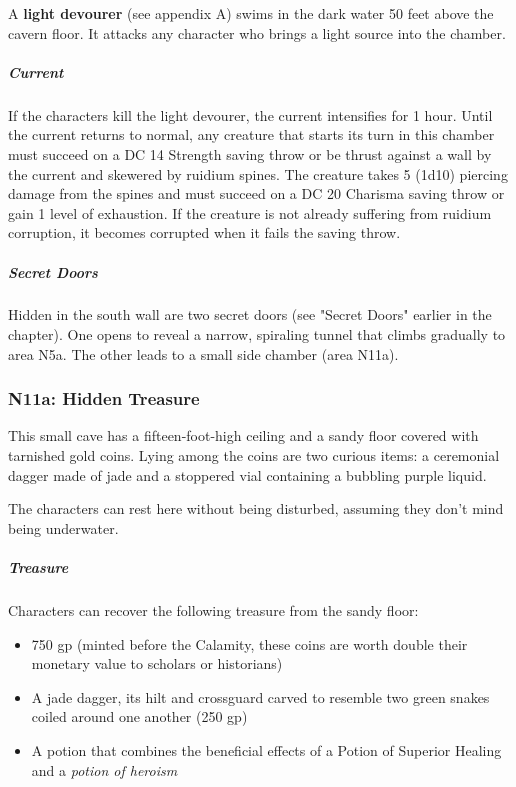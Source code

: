 \documentclass[10pt,a4paper,twoside,bg=print,twocolumn,openany,nodeprecatedcode]{dndbook}
\begin{document}
A \textbf{light devourer} (see appendix A) swims in the dark water 50 feet above the cavern floor. It attacks any character who brings a light source into the chamber.

\subparagraph{Current}
If the characters kill the light devourer, the current intensifies for 1 hour. Until the current returns to normal, any creature that starts its turn in this chamber must succeed on a DC 14 Strength saving throw or be thrust against a wall by the current and skewered by ruidium spines. The creature takes 5 (1d10) piercing damage from the spines and must succeed on a DC 20 Charisma saving throw or gain 1 level of exhaustion. If the creature is not already suffering from ruidium corruption, it becomes corrupted when it fails the saving throw.

\subparagraph{Secret Doors}
Hidden in the south wall are two secret doors (see "Secret Doors" earlier in the chapter). One opens to reveal a narrow, spiraling tunnel that climbs gradually to area N5a. The other leads to a small side chamber (area N11a).

\subsubsection{N11a: Hidden Treasure}
\begin{DndReadAloud}{}
This small cave has a fifteen-foot-high ceiling and a sandy floor covered with tarnished gold coins. Lying among the coins are two curious items: a ceremonial dagger made of jade and a stoppered vial containing a bubbling purple liquid.

\end{DndReadAloud}

The characters can rest here without being disturbed, assuming they don't mind being underwater.

\subparagraph{Treasure}
Characters can recover the following treasure from the sandy floor:


\begin{itemize}
\item 750 gp (minted before the Calamity, these coins are worth double their monetary value to scholars or historians)
\item A jade dagger, its hilt and crossguard carved to resemble two green snakes coiled around one another (250 gp)
\item A potion that combines the beneficial effects of a Potion of Superior Healing and a \textit{potion of heroism}
\end{itemize}
\end{document}
